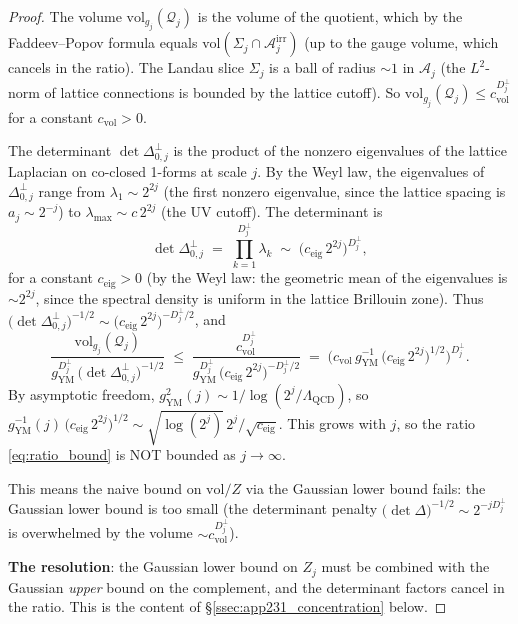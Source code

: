 \begin{proof}
The volume $\mathrm{vol}_{g_{j}}(\mathcal{Q}_{j})$ is the volume of
the quotient, which by the Faddeev--Popov formula equals
$\mathrm{vol}(\Sigma_{j}\cap\mathcal{A}_{j}^{\mathrm{irr}})$ (up to
the gauge volume, which cancels in the ratio). The Landau slice
$\Sigma_{j}$ is a ball of radius $\sim 1$ in $\mathcal{A}_{j}$ (the
$L^{2}$-norm of lattice connections is bounded by the lattice cutoff).
So $\mathrm{vol}_{g_{j}}(\mathcal{Q}_{j})\le c_{\mathrm{vol}}^{
D_{j}^{\perp}}$ for a constant $c_{\mathrm{vol}}>0$.

The determinant $\det\Delta_{0,j}^{\perp}$ is the product of the
nonzero eigenvalues of the lattice Laplacian on co-closed 1-forms at
scale $j$. By the Weyl law, the eigenvalues of $\Delta_{0,j}^{\perp}$
range from $\lambda_{1}\sim 2^{2j}$ (the first nonzero eigenvalue,
since the lattice spacing is $a_{j}\sim 2^{-j}$) to
$\lambda_{\max}\sim c\,2^{2j}$ (the UV cutoff). The determinant is
\begin{equation}
\label{eq:det_weyl}
  \det\Delta_{0,j}^{\perp}
  \;=\;\prod_{k=1}^{D_{j}^{\perp}}\lambda_{k}
  \;\sim\;\bigl(c_{\mathrm{eig}}\,2^{2j}\bigr)^{D_{j}^{\perp}},
\end{equation}
for a constant $c_{\mathrm{eig}}>0$ (by the Weyl law: the geometric
mean of the eigenvalues is $\sim 2^{2j}$, since the spectral density
is uniform in the lattice Brillouin zone). Thus
$\bigl(\det\Delta_{0,j}^{\perp}\bigr)^{-1/2}\sim
\bigl(c_{\mathrm{eig}}\,2^{2j}\bigr)^{-D_{j}^{\perp}/2}$, and
\begin{equation}
\label{eq:ratio_bound}
  \frac{\mathrm{vol}_{g_{j}}(\mathcal{Q}_{j})}{
  g_{\mathrm{YM}}^{D_{j}^{\perp}}\,
  \bigl(\det\Delta_{0,j}^{\perp}\bigr)^{-1/2}}
  \;\le\;\frac{c_{\mathrm{vol}}^{D_{j}^{\perp}}}{
  g_{\mathrm{YM}}^{D_{j}^{\perp}}\,
  \bigl(c_{\mathrm{eig}}\,2^{2j}\bigr)^{-D_{j}^{\perp}/2}}
  \;=\;\bigl(c_{\mathrm{vol}}\,g_{\mathrm{YM}}^{-1}\,
  \bigl(c_{\mathrm{eig}}\,2^{2j}\bigr)^{1/2}\bigr)^{D_{j}^{\perp}}.
\end{equation}
By asymptotic freedom, $g_{\mathrm{YM}}^{2}(j)\sim
1/\log(2^{j}/\Lambda_{\mathrm{QCD}})$, so
$g_{\mathrm{YM}}^{-1}(j)\,\bigl(c_{\mathrm{eig}}\,2^{2j}\bigr)^{1/2}
\sim\sqrt{\log(2^{j})}\,2^{j}/\sqrt{c_{\mathrm{eig}}}$. This grows
with $j$, so the ratio \eqref{eq:ratio_bound} is NOT bounded as
$j\to\infty$.

This means the naive bound on $\mathrm{vol}/Z$ via the Gaussian lower
bound fails: the Gaussian lower bound is too small (the determinant
penalty $\bigl(\det\Delta\bigr)^{-1/2}\sim 2^{-jD_{j}^{\perp}}$ is
overwhelmed by the volume $\sim c_{\mathrm{vol}}^{D_{j}^{\perp}}$).

\textbf{The resolution}: the Gaussian lower bound on $Z_{j}$ must be
combined with the Gaussian \emph{upper} bound on the complement, and
the determinant factors cancel in the ratio. This is the content of
\S\ref{ssec:app231_concentration} below.
\end{proof}

